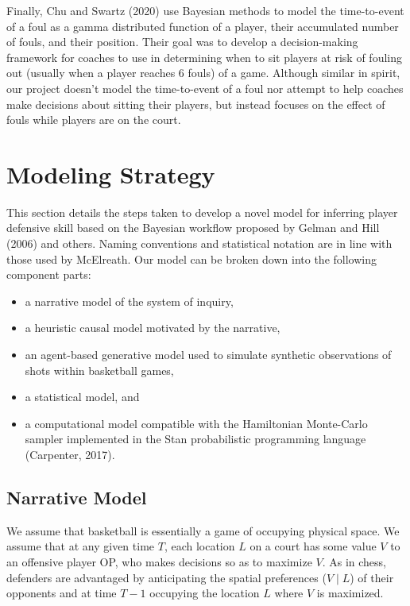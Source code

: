 \documentclass[
  letterpaper,
  DIV=11,
  numbers=noendperiod]{scrartcl}
\begin{document}
Finally, Chu and Swartz (2020) use Bayesian methods to model the
time-to-event of a foul as a gamma distributed function of a player,
their accumulated number of fouls, and their position. Their goal was to
develop a decision-making framework for coaches to use in determining
when to sit players at risk of fouling out (usually when a player
reaches 6 fouls) of a game. Although similar in spirit, our project
doesn't model the time-to-event of a foul nor attempt to help coaches
make decisions about sitting their players, but instead focuses on the
effect of fouls while players are on the court.

\section{Modeling Strategy}\label{modeling-strategy}

This section details the steps taken to develop a novel model for
inferring player defensive skill based on the Bayesian workflow proposed
by Gelman and Hill (2006) and others. Naming conventions and statistical
notation are in line with those used by McElreath. Our model can be
broken down into the following component parts:

\begin{itemize}
\item
  a narrative model of the system of inquiry,
\item
  a heuristic causal model motivated by the narrative,
\item
  an agent-based generative model used to simulate synthetic
  observations of shots within basketball games,
\item
  a statistical model, and
\item
  a computational model compatible with the Hamiltonian Monte-Carlo
  sampler implemented in the Stan probabilistic programming language
  (Carpenter, 2017).
\end{itemize}

\subsection{Narrative Model}\label{narrative-model}

We assume that basketball is essentially a game of occupying physical
space. We assume that at any given time \(T\), each location \(L\) on a
court has some value \(V\) to an offensive player OP, who makes
decisions so as to maximize \(V\). As in chess, defenders are advantaged
by anticipating the spatial preferences (\(V \mid L\)) of their
opponents and at time \(T-1\) occupying the location \(L\) where \(V\)
is maximized.
\end{document}
